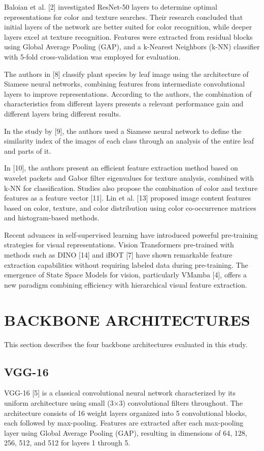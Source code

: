 \documentclass[conference]{IEEEtran}
\begin{document}
Baloian et al. [2] investigated ResNet-50 layers to determine optimal representations for color and texture searches. Their research concluded that initial layers of the network are better suited for color recognition, while deeper layers excel at texture recognition. Features were extracted from residual blocks using Global Average Pooling (GAP), and a k-Nearest Neighbors (k-NN) classifier with 5-fold cross-validation was employed for evaluation.

The authors in [8] classify plant species by leaf image using the architecture of Siamese neural networks, combining features from intermediate convolutional layers to improve representations. According to the authors, the combination of characteristics from different layers presents a relevant performance gain and different layers bring different results.

In the study by [9], the authors used a Siamese neural network to define the similarity index of the images of each class through an analysis of the entire leaf and parts of it.

In [10], the authors present an efficient feature extraction method based on wavelet packets and Gabor filter eigenvalues for texture analysis, combined with k-NN for classification. Studies also propose the combination of color and texture features as a feature vector [11]. Lin et al. [13] proposed image content features based on color, texture, and color distribution using color co-occurrence matrices and histogram-based methods.

Recent advances in self-supervised learning have introduced powerful pre-training strategies for visual representations. Vision Transformers pre-trained with methods such as DINO [14] and iBOT [7] have shown remarkable feature extraction capabilities without requiring labeled data during pre-training. The emergence of State Space Models for vision, particularly VMamba [4], offers a new paradigm combining efficiency with hierarchical visual feature extraction.


\section{BACKBONE ARCHITECTURES}

This section describes the four backbone architectures evaluated in this study.

\subsection{VGG-16}
VGG-16 [5] is a classical convolutional neural network characterized by its uniform architecture using small (3×3) convolutional filters throughout. The architecture consists of 16 weight layers organized into 5 convolutional blocks, each followed by max-pooling. Features are extracted after each max-pooling layer using Global Average Pooling (GAP), resulting in dimensions of 64, 128, 256, 512, and 512 for layers 1 through 5.
\end{document}
